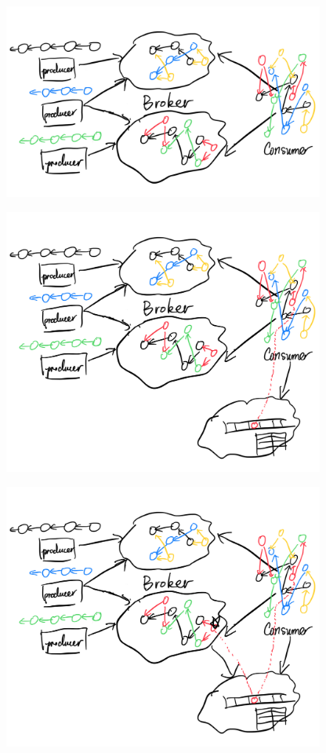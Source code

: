 \begin{figure}[H]
    \includegraphics[width=300pt]{graphs/IMG_0055}
    \Description{}
\end{figure}
\begin{figure}[H]
    \includegraphics[width=300pt]{graphs/IMG_0054}
    \Description{}
\end{figure}
\begin{figure}[H]
    \includegraphics[width=300pt]{graphs/IMG_0053}
    \Description{}
\end{figure}
